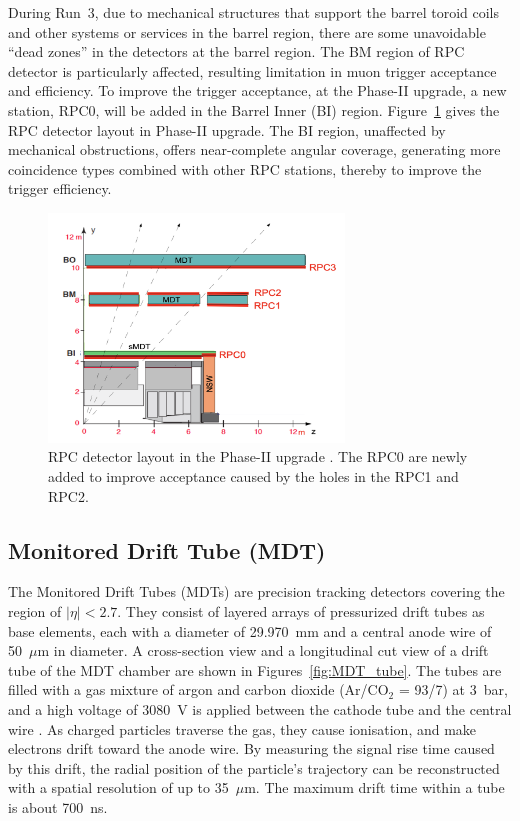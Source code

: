 During Run~3, due to mechanical structures that support the barrel toroid coils and other systems or services in the barrel region, there are some unavoidable ``dead zones'' in the detectors at the barrel region. The BM region of RPC detector is particularly affected, resulting limitation in muon trigger acceptance and efficiency. To improve the trigger acceptance, at the Phase-II upgrade, a new station, RPC0, will be added in the Barrel Inner (BI) region. Figure~\ref{fig:RPC_structure_upgrade} gives the RPC detector layout in Phase-II upgrade. The BI region, unaffected by mechanical obstructions, offers near-complete angular coverage, generating more coincidence types combined with other RPC stations, thereby to improve the trigger efficiency.

\begin{figure}[htbp]
  \centering
  \includegraphics[width=0.7\textwidth]{figs/chapter2/RPC_detector_structure.png}
  \caption{RPC detector layout in the Phase-II upgrade \cite{TDAQ_TDR}. The RPC0 are newly added to improve acceptance caused by the holes in the RPC1 and RPC2.}
  \label{fig:RPC_structure_upgrade}
\end{figure}

\subsection{Monitored Drift Tube (MDT)}
The Monitored Drift Tubes (MDTs) are precision tracking detectors covering the region of $|\eta| < 2.7$. They consist of layered arrays of pressurized drift tubes as base elements, each with a diameter of 29.970~mm and a central anode wire of 50~$\mu$m in diameter. A cross-section view and a longitudinal cut view of a drift tube of the MDT chamber are shown in Figures~\ref{fig:MDT_tube}. The tubes are filled with a gas mixture of argon and carbon dioxide (Ar/CO$_2$ = 93/7) at 3~bar, and a high voltage of 3080~V is applied between the cathode tube and the central wire \cite{ATLASDetector2008}. As charged particles traverse the gas, they cause ionisation, and make electrons drift toward the anode wire. By measuring the signal rise time caused by this drift, the radial position of the particle's trajectory can be reconstructed with a spatial resolution of up to 35~$\mu$m. The maximum drift time within a tube is about 700~ns.

